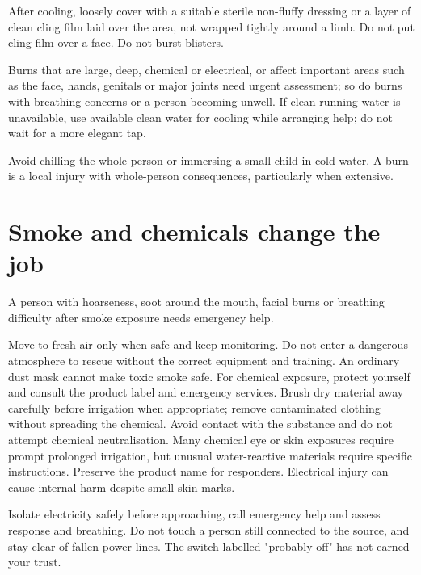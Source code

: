 \documentclass[10pt,openright]{book}
\begin{document}
After cooling, loosely cover with a suitable sterile non-fluffy dressing or a layer of clean cling film laid over the area, not wrapped tightly around a limb. Do not put cling film over a face. Do not burst blisters.

Burns that are large, deep, chemical or electrical, or affect important areas such as the face, hands, genitals or major joints need urgent assessment; so do burns with breathing concerns or a person becoming unwell. If clean running water is unavailable, use available clean water for cooling while arranging help; do not wait for a more elegant tap.

Avoid chilling the whole person or immersing a small child in cold water. A burn is a local injury with whole-person consequences, particularly when extensive.

\section*{Smoke and chemicals change the job}
A person with hoarseness, soot around the mouth, facial burns or breathing difficulty after smoke exposure needs emergency help.

Move to fresh air only when safe and keep monitoring. Do not enter a dangerous atmosphere to rescue without the correct equipment and training. An ordinary dust mask cannot make toxic smoke safe. For chemical exposure, protect yourself and consult the product label and emergency services. Brush dry material away carefully before irrigation when appropriate; remove contaminated clothing without spreading the chemical. Avoid contact with the substance and do not attempt chemical neutralisation. Many chemical eye or skin exposures require prompt prolonged irrigation, but unusual water-reactive materials require specific instructions. Preserve the product name for responders. Electrical injury can cause internal harm despite small skin marks.

Isolate electricity safely before approaching, call emergency help and assess response and breathing. Do not touch a person still connected to the source, and stay clear of fallen power lines. The switch labelled "probably off" has not earned your trust.
\end{document}

